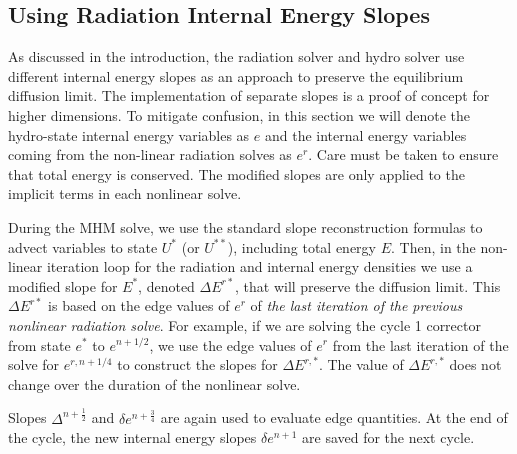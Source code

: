 \documentclass[preprint,12pt]{elsarticle}
\newcommand{\half}{\frac{1}{2}}
\begin{document}
\subsection{Using Radiation Internal Energy Slopes}
\label{sec:e_slopes}

As discussed in the introduction, the radiation solver and hydro solver use different
internal energy slopes as an approach to preserve the equilibrium diffusion limit.   The
implementation of separate slopes is a proof of concept for higher dimensions.
To mitigate confusion, in this section we will denote the hydro-state internal energy variables as $e$ and
the internal energy variables coming from the non-linear radiation solves as $e^r$. Care must be taken to
ensure that total energy is conserved.  The modified slopes are only applied to the implicit terms in each
nonlinear solve.

During the MHM solve, we
use the standard slope reconstruction formulas to advect variables to
state $U^*$ (or $U^{**}$), including total energy $E$.  Then, in the non-linear iteration loop for the radiation
and internal energy densities we use a modified slope for $E^*$, denoted $\Delta E^{r*}$, that will preserve the diffusion
limit.  This $\Delta E^{r*}$ is based on the edge values of $e^r$ of \emph{the last iteration of the previous
nonlinear radiation solve}.  For example, if we are solving the cycle 1 corrector from state $e^*$ to
$e^{n+1/2}$, we use the edge values of $e^r$ from the last iteration of the solve for
$e^{r,n+1/4}$ to construct the slopes for $\Delta E^{r,*}$. The value of $\Delta
E^{r,*}$ does not change over the duration of the nonlinear solve.

Slopes
$\Delta^{n+\half}$ and $\delta e^{n+\frac{3}{4}}$  are again
used to evaluate edge quantities. At the end
of the cycle, the new internal energy slopes $\delta e^{n+1}$
are saved for the next cycle.
\end{document}
